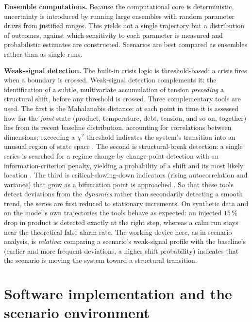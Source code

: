 \documentclass[a4paper,fleqn]{cas-sc}
\begin{document}
\textbf{Ensemble computations.} Because the computational core is deterministic, uncertainty is
introduced by running large ensembles with random parameter draws from justified ranges. This yields
not a single trajectory but a distribution of outcomes, against which sensitivity to each parameter
is measured and probabilistic estimates are constructed. Scenarios are best compared as ensembles
rather than as single runs.

\textbf{Weak-signal detection.} The built-in crisis logic is threshold-based: a crisis fires when a
boundary is crossed. Weak-signal detection complements it: the identification of a subtle,
multivariate accumulation of tension \emph{preceding} a structural shift, before any threshold is
crossed. Three complementary tools are used. The first is the Mahalanobis distance: at each point in
time it is assessed how far the \emph{joint} state (product, temperature, debt, tension, and so on,
together) lies from its recent baseline distribution, accounting for correlations between
dimensions; exceeding a $\chi^2$ threshold indicates the system's transition into an unusual region
of state space \citep{mahalanobis1936,wilson1931}. The second is structural-break detection: a
single series is searched for a regime change by change-point detection with an information-criterion
penalty, yielding a probability of a shift and its most likely location \citep{schwarz1978}. The
third is critical-slowing-down indicators (rising autocorrelation and variance) that grow as a
bifurcation point is approached \citep{scheffer2009}. So that these tools detect deviations from the
\emph{dynamics} rather than secondarily detecting a smooth trend, the series are first reduced to
stationary increments. On synthetic data and on the model's own trajectories the tools behave as
expected: an injected $15\,\%$ drop in product is detected exactly at the right step, whereas a calm
run stays near the theoretical false-alarm rate. The working device here, as in scenario analysis,
is \emph{relative}: comparing a scenario's weak-signal profile with the baseline's (earlier and more
frequent deviations, a higher shift probability) indicates that the scenario is moving the system
toward a structural transition.

\section{Software implementation and the scenario environment}
\label{sec:repo}
\end{document}
